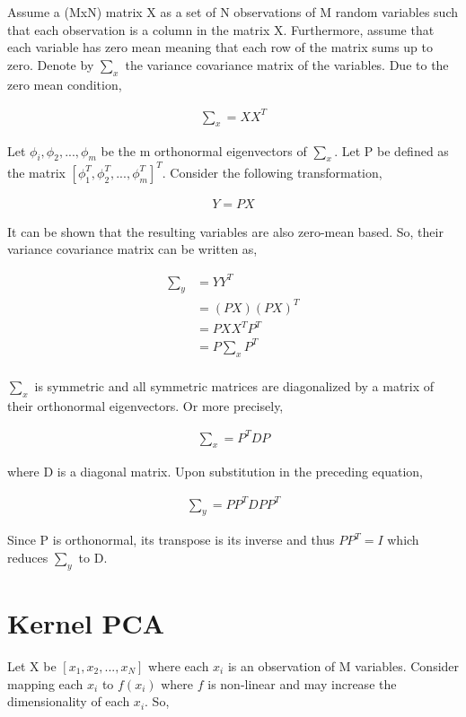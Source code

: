 \documentclass[11pt, a4paper]{article}
\begin{document}
Assume a (MxN) matrix X as a set of N observations of M random variables such that each observation is a column in the matrix X. Furthermore, assume that each variable has zero mean meaning that each row of the matrix sums up to zero. Denote by $\sum_x$ the variance covariance matrix of the variables. Due to the zero mean condition, 

\begin{align*}
	\sum_x = XX^T 
\end{align*} 

Let $\phi_i, \phi_2, ..., \phi_m$ be the m orthonormal eigenvectors of $\sum_x$. Let P be defined as the matrix $[\phi_1^T, \phi_2^T, ..., \phi_m^T]^T$. Consider the following transformation, 

\begin{align*}
	Y = PX 
\end{align*}

It can be shown that the resulting variables are also zero-mean based. So, their variance covariance matrix can be written as,

\begin{align*}
	\sum_y & = YY^T       \\
	       & = (PX)(PX)^T \\
	       & = PXX^TP^T   \\
	       & = P\sum_xP^T \\           
\end{align*}

$\sum_x$ is symmetric and all symmetric matrices are diagonalized by a matrix of their orthonormal eigenvectors. Or more precisely,

\begin{align*}
	\sum_x = P^TDP 
\end{align*}

where D is a diagonal matrix. Upon substitution in the preceding equation,

\begin{align*}
	\sum_y = PP^TDPP^T 
\end{align*}

Since P is orthonormal, its transpose is its inverse and thus $PP^T = I$ which reduces $\sum_y$ to D.

\section{Kernel PCA}

Let X be $[x_1, x_2, ..., x_N]$ where each $x_i$ is an observation of M variables. Consider mapping each $x_i$ to $f(x_i)$ where $f$ is non-linear and may increase the dimensionality of each $x_i$. So,
\end{document}
